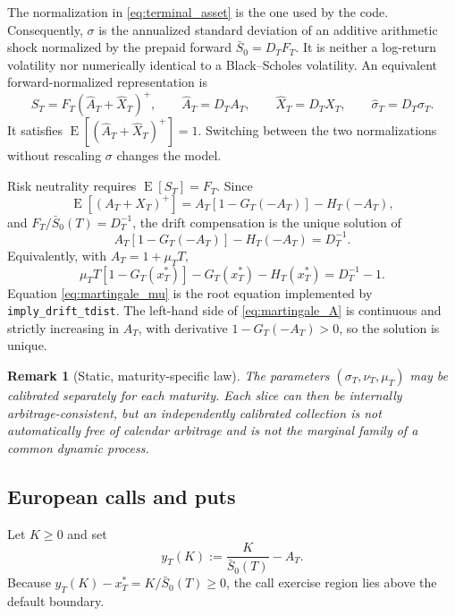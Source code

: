 \documentclass[11pt,a4paper]{article}
\newtheorem{remark}{Remark}[section]
\DeclareMathOperator{\E}{E}
\newcommand{\cdf}{G}
\begin{document}
The normalization in \eqref{eq:terminal_asset} is the one used by the code.
Consequently, $\sigma$ is the annualized standard deviation of an additive
arithmetic shock normalized by the prepaid forward $\bar S_0=D_TF_T$.  It is
neither a log-return volatility nor numerically identical to a Black--Scholes
volatility.  An equivalent forward-normalized representation is
\begin{equation}
  S_T=F_T(\widehat A_T+\widehat X_T)^+,
  \qquad
  \widehat A_T=D_TA_T,
  \qquad
  \widehat X_T=D_TX_T,
  \qquad
  \widehat\sigma_T=D_T\sigma_T.
  \label{eq:forward_normalization}
\end{equation}
It satisfies $\E[(\widehat A_T+\widehat X_T)^+]=1$.  Switching between the
two normalizations without rescaling $\sigma$ changes the model.

Risk neutrality requires $\E[S_T]=F_T$.  Since
\begin{equation}
  \E[(A_T+X_T)^+]
  =A_T[1-\cdf_T(-A_T)]-H_T(-A_T),
\end{equation}
and $F_T/\bar S_0(T)=D_T^{-1}$, the drift compensation is the unique solution
of
\begin{equation}
  A_T[1-\cdf_T(-A_T)]-H_T(-A_T)=D_T^{-1}.
  \label{eq:martingale_A}
\end{equation}
Equivalently, with $A_T=1+\mu_TT$,
\begin{equation}
  \mu_TT[1-\cdf_T(x_T^*)]
  -\cdf_T(x_T^*)-H_T(x_T^*)
  =D_T^{-1}-1.
  \label{eq:martingale_mu}
\end{equation}
Equation \eqref{eq:martingale_mu} is the root equation implemented by
\texttt{imply\_drift\_tdist}.  The left-hand side of
\eqref{eq:martingale_A} is continuous and strictly increasing in $A_T$, with
derivative $1-\cdf_T(-A_T)>0$, so the solution is unique.

\begin{remark}[Static, maturity-specific law]
The parameters $(\sigma_T,\nu_T,\mu_T)$ may be calibrated separately for each
maturity.  Each slice can then be internally arbitrage-consistent, but an
independently calibrated collection is not automatically free of calendar
arbitrage and is not the marginal family of a common dynamic process.
\end{remark}

\subsection{European calls and puts}

Let $K\ge0$ and set
\begin{equation}
  y_T(K):=\frac{K}{\bar S_0(T)}-A_T.
  \label{eq:exercise_boundary}
\end{equation}
Because $y_T(K)-x_T^*=K/\bar S_0(T)\ge0$, the call exercise region lies above
the default boundary.
\end{document}
